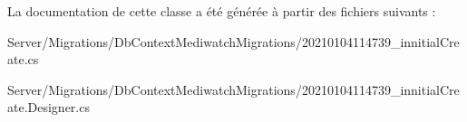 La documentation de cette classe a été générée à partir des fichiers suivants \+:\begin{DoxyCompactItemize}
\item 
Server/\+Migrations/\+Db\+Context\+Mediwatch\+Migrations/20210104114739\+\_\+innitial\+Create.\+cs\item 
Server/\+Migrations/\+Db\+Context\+Mediwatch\+Migrations/20210104114739\+\_\+innitial\+Create.\+Designer.\+cs\end{DoxyCompactItemize}
